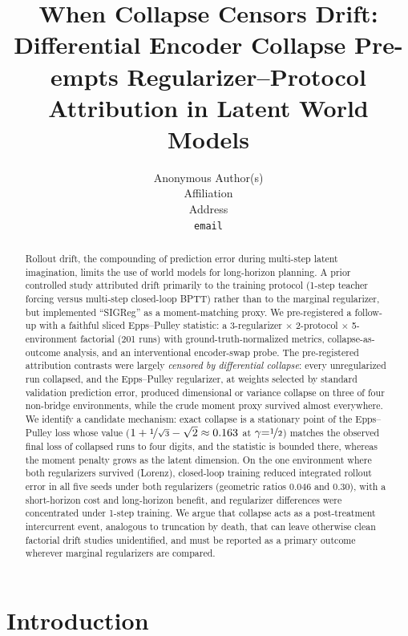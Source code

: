 \documentclass{article}
\title{When Collapse Censors Drift: Differential Encoder Collapse Pre-empts Regularizer--Protocol Attribution in Latent World Models}
\author{%
  Anonymous Author(s)\\
  Affiliation\\
  Address\\
  \texttt{email}
}
\begin{document}
\maketitle

\begin{abstract}
Rollout drift, the compounding of prediction error during multi-step latent imagination, limits the use of world models for long-horizon planning. A prior controlled study attributed drift primarily to the training protocol (1-step teacher forcing versus multi-step closed-loop BPTT) rather than to the marginal regularizer, but implemented ``SIGReg'' as a moment-matching proxy. We pre-registered a follow-up with a faithful sliced Epps--Pulley statistic: a 3-regularizer $\times$ 2-protocol $\times$ 5-environment factorial (201 runs) with ground-truth-normalized metrics, collapse-as-outcome analysis, and an interventional encoder-swap probe. The pre-registered attribution contrasts were largely \emph{censored by differential collapse}: every unregularized run collapsed, and the Epps--Pulley regularizer, at weights selected by standard validation prediction error, produced dimensional or variance collapse on three of four non-bridge environments, while the crude moment proxy survived almost everywhere. We identify a candidate mechanism: exact collapse is a stationary point of the Epps--Pulley loss whose value ($1+\nicefrac{1}{\sqrt3}-\sqrt2\approx0.163$ at $\gamma{=}\nicefrac12$) matches the observed final loss of collapsed runs to four digits, and the statistic is bounded there, whereas the moment penalty grows as the latent dimension. On the one environment where both regularizers survived (Lorenz), closed-loop training reduced integrated rollout error in all five seeds under both regularizers (geometric ratios $0.046$ and $0.30$), with a short-horizon cost and long-horizon benefit, and regularizer differences were concentrated under 1-step training. We argue that collapse acts as a post-treatment intercurrent event, analogous to truncation by death, that can leave otherwise clean factorial drift studies unidentified, and must be reported as a primary outcome wherever marginal regularizers are compared.
\end{abstract}

\section{Introduction}
\label{sec:intro}
\end{document}

